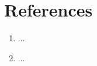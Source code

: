 
\section*{References}
\begin{enumerate}\setlength{\itemsep}{0.15em}
  \item ...
  \item ...
\end{enumerate}
